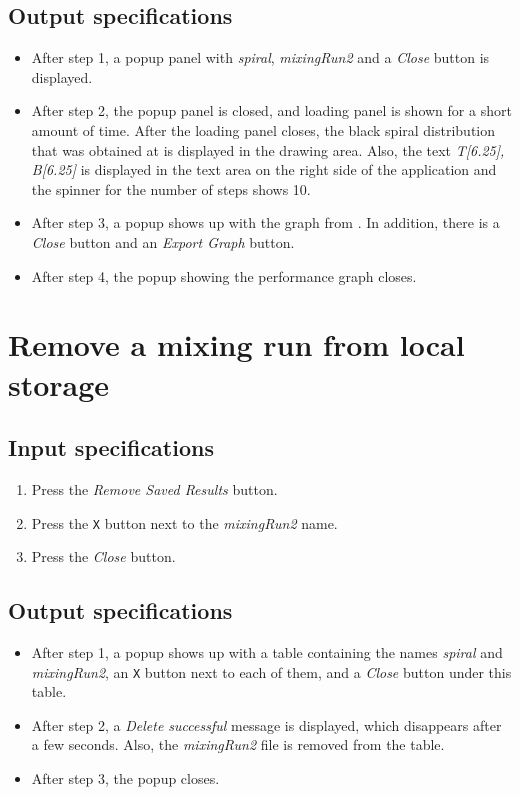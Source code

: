 \subsection*{Output specifications}
\begin{itemize}
\item After step 1, a popup panel with \emph{spiral}, \emph{mixingRun2} and a \emph{Close} button is displayed.
\item After step 2, the popup panel is closed, and loading panel is shown for a short amount of time. After the loading panel closes, the black spiral distribution that was obtained at  is displayed in the drawing area. Also, the text \emph{T[6.25], B[6.25]} is displayed in the text area on the right side of the application and the spinner for the number of steps shows 10.
\item After step 3, a popup shows up with the graph from . In addition, there is a \emph{Close} button and an \emph{Export Graph} button.
\item After step 4, the popup showing the performance graph closes.
\end{itemize}

\section{Remove a mixing run from local storage}

\subsection*{Input specifications}
\begin{enumerate}
\item Press the \emph{Remove Saved Results} button.
\item Press the \texttt{X} button next to the \emph{mixingRun2} name.
\item Press the \emph{Close} button.
\end{enumerate}

\subsection*{Output specifications}
\begin{itemize}
\item After step 1, a popup shows up with a table containing the names \emph{spiral} and \emph{mixingRun2}, an \texttt{X} button next to each of them, and a \emph{Close} button under this table.
\item After step 2, a \emph{Delete successful} message is displayed, which disappears after a few seconds. Also, the \emph{mixingRun2} file is removed from the table.
\item After step 3, the popup closes.
\end{itemize}


